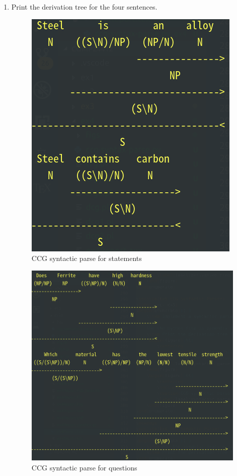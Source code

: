 \documentclass[12pt]{article}
\begin{document}
{\begin{enumerate}[1.]
    See the python file in appendix C.
    \item Print the derivation tree for the four sentences.
    \begin{figure}[ht]
        \centering
        \includegraphics[scale=0.35]{figs/syntax-parse1.png}
        \caption{CCG syntactic parse for statements}
        \label{label:syntactic parse 1}
    \end{figure}
    \begin{figure}[ht]
        \centering
        \includegraphics[scale=0.32]{figs/syntax-parse2.png}
        \caption{CCG syntactic parse for questions}
        \label{label:syntactic parse 2}
    \end{figure}
\end{enumerate}

}
\end{document}
